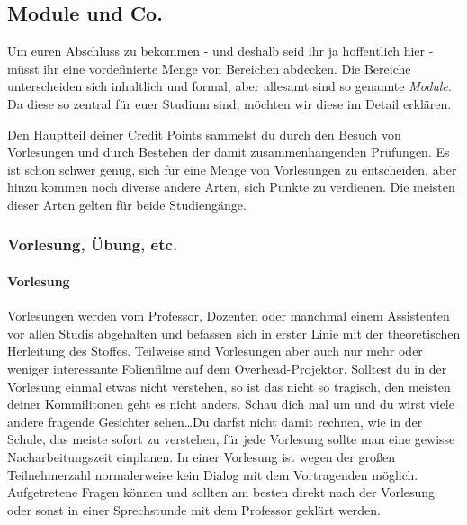 \begin{multicols}{2}    %
\subsection{Module und Co.}
	Um euren Abschluss zu bekommen - und deshalb seid ihr ja hoffentlich hier - müsst ihr eine vordefinierte Menge von Bereichen abdecken. Die Bereiche unterscheiden sich inhaltlich und formal, aber allesamt sind so genannte \textit{Module}. Da diese so zentral für euer Studium sind, möchten wir diese im Detail erklären.
	
	Den Hauptteil deiner  Credit Points sammelst du durch den Besuch von Vorlesungen und durch Bestehen der damit zusammenhängenden Prüfungen. Es ist schon schwer genug, sich für eine Menge von Vorlesungen zu entscheiden, aber hinzu kommen noch diverse andere 
	Arten, sich Punkte zu verdienen. Die meisten dieser Arten gelten für beide Studiengänge.

\subsubsection{Vorlesung, Übung, etc.}
	\paragraph*{Vorlesung}
	Vorlesungen werden vom Professor, Dozenten oder manchmal einem Assistenten vor allen Studis abgehalten und befassen sich in erster Linie mit der theoretischen Herleitung des Stoffes. Teilweise sind Vorlesungen aber auch nur mehr oder weniger interessante Folienfilme auf dem Overhead-Projektor. Solltest du in der Vorlesung einmal etwas nicht verstehen, so ist das nicht so tragisch, den meisten deiner Kommilitonen geht es nicht anders. Schau dich mal um und du wirst viele andere fragende Gesichter sehen\ldots Du darfst nicht damit rechnen, wie in der Schule, das meiste sofort zu verstehen, für jede Vorlesung sollte man eine gewisse Nacharbeitungszeit einplanen. In einer Vorlesung ist wegen der großen Teilnehmerzahl normalerweise kein Dialog mit dem Vortragenden möglich. Aufgetretene Fragen können und sollten am besten direkt nach der Vorlesung oder sonst in einer Sprechstunde mit dem Professor geklärt werden.
	

\end{multicols}
